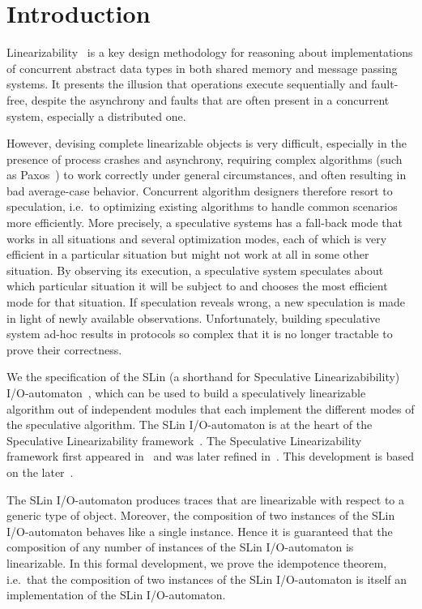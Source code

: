 \section{Introduction}

Linearizability~\cite{HerlihyWing90Linearizability} is a key design methodology
for reasoning about implementations of concurrent abstract data types in both
shared memory and message passing systems. It presents the illusion that
operations execute sequentially and fault-free, despite the asynchrony and
faults that are often present in a concurrent system, especially a distributed
one.

However, devising complete linearizable objects is very difficult, especially
in the presence of process crashes and asynchrony, requiring complex algorithms
(such as Paxos~\cite{Lamport98PartTimeParliament}) to work correctly under
general circumstances, and often resulting in bad average-case behavior.
Concurrent algorithm designers therefore resort to speculation, i.e.\ to
optimizing existing algorithms to handle common scenarios more efficiently.
More precisely, a speculative systems has a fall-back mode that works in all
situations and several optimization modes, each of which is very efficient in
a particular situation but might not work at all in some other situation. By
observing its execution, a speculative system speculates about which particular
situation it will be subject to and chooses the most efficient mode for that
situation. If speculation reveals wrong, a new speculation is made in light of
newly available observations. Unfortunately, building speculative system ad-hoc
results in protocols so complex that it is no longer tractable to prove their
correctness.

We the specification of the SLin (a shorthand for Speculative
Linearizabibility) I/O-automaton~\cite{Lynch89anintroduction}, which can
be used to build a speculatively linearizable algorithm out of independent
modules that each implement the different modes of the speculative
algorithm. The SLin I/O-automaton is at the heart of the Speculative
Linearizability framework~\cite{Losa2014,GKL2012SpeculativeLinearizability}.
The Speculative Linearizability framework first appeared
in~\cite{GKL2012SpeculativeLinearizability} and was later refined
in~\cite{Losa2014}. This development is based on the later~\cite{Losa2014}.

The SLin I/O-automaton produces traces that are linearizable with respect to
a generic type of object. Moreover, the composition of two instances of the
SLin I/O-automaton behaves like a single instance. Hence it is guaranteed
that the composition of any number of instances of the SLin I/O-automaton is
linearizable. In this formal development, we prove the idempotence theorem,
i.e.\ that the composition of two instances of the SLin I/O-automaton is itself
an implementation of the SLin I/O-automaton.

